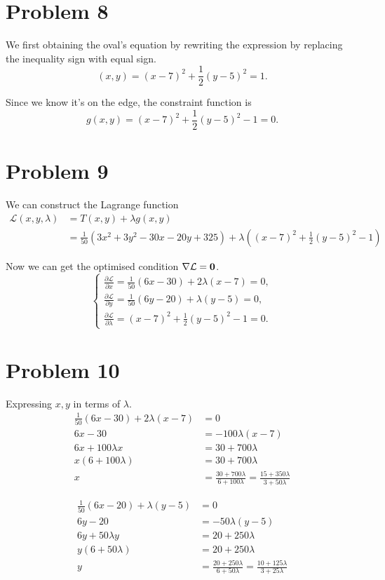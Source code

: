 \documentclass[12pt,a4paper]{article}
\begin{document}
\section*{Problem 8}
\begin{solution}
We first obtaining the oval's equation by rewriting the expression by replacing the inequality sign with equal sign.
$$(x,y)=(x-7)^2+\frac{1}{2}(y-5)^2=1.$$

Since we know it's on the edge, the constraint function is
$$g(x,y)=(x-7)^2+\frac{1}{2}(y-5)^2 - 1 = 0.$$
\end{solution}

\section*{Problem 9}
\begin{solution}
We can construct the Lagrange function
\begin{align*}
\mathcal{L}(x, y, \lambda) &= T(x, y) + \lambda g(x, y) \\
&= \frac{1}{50} \left(3x^2 + 3y^2 - 30x - 20y + 325\right) + \lambda \left((x - 7)^2 + \frac{1}{2}(y - 5)^2 - 1\right)
\end{align*}

Now we can get the optimised condition $\nabla \mathcal{L} = \mathbf{0}$.
\[
\begin{cases}
\frac{\partial \mathcal{L}}{\partial x} = \frac{1}{50}(6x - 30) + 2\lambda(x - 7) = 0, \\
\frac{\partial \mathcal{L}}{\partial y} = \frac{1}{50}(6y - 20) + \lambda(y - 5) = 0, \\
\frac{\partial \mathcal{L}}{\partial \lambda} = (x - 7)^2 + \frac{1}{2}(y - 5)^2 - 1 = 0.
\end{cases}
\]
\end{solution}
\section*{Problem 10}
\begin{solution}
Expressing $x,y$ in terms of $\lambda$.
\begin{align*}
    \frac{1}{50}(6x - 30) + 2\lambda(x - 7) &= 0\\
    6x-30&=-100\lambda(x-7)\\
    6x + 100\lambda x&=30+700\lambda\\
    x(6+100\lambda)&=30+700\lambda\\
    x&=\frac{30+700\lambda}{6+100\lambda} = \frac{15+350\lambda}{3+50\lambda}
\end{align*}

\begin{align*}
    \frac{1}{50}(6x - 20) + \lambda(y - 5) &= 0\\
    6y - 20 &=-50\lambda(y - 5)\\
    6y + 50\lambda y&=20+250\lambda\\
    y(6+50\lambda) &=20+250\lambda\\
    y&=\frac{20+250\lambda}{6+50\lambda} = \frac{10+125\lambda}{3+25\lambda}
\end{align*}
\end{solution}
\end{document}
